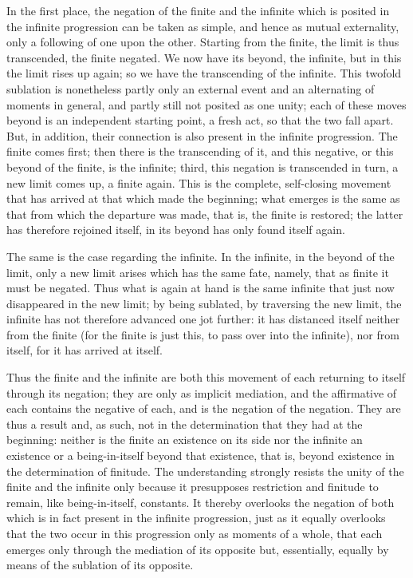 In the first place,
the negation of the finite and the infinite
which is posited in the infinite progression
can be taken as simple,
and hence as mutual externality,
only a following of one upon the other.
Starting from the finite,
the limit is thus transcended, the finite negated.
We now have its beyond, the infinite,
but in this the limit rises up again;
so we have the transcending of the infinite.
This twofold sublation is nonetheless
partly only an external event
and an alternating of moments in general,
and partly still not posited as one unity;
each of these moves beyond is an independent starting point,
a fresh act, so that the two fall apart.
But, in addition, their connection is
also present in the infinite progression.
The finite comes first;
then there is the transcending of it,
and this negative, or this beyond of the finite,
is the infinite;
third, this negation is transcended in turn,
a new limit comes up, a finite again.
This is the complete, self-closing movement
that has arrived at that which made the beginning;
what emerges is the same as that
from which the departure was made,
that is, the finite is restored;
the latter has therefore rejoined itself,
in its beyond has only found itself again.

The same is the case regarding the infinite.
In the infinite, in the beyond of the limit,
only a new limit arises which has the same fate, namely,
that as finite it must be negated.
Thus what is again at hand is the same infinite
that just now disappeared in the new limit;
by being sublated, by traversing the new limit,
the infinite has not therefore advanced one jot further:
it has distanced itself neither from the finite
(for the finite is just this,
to pass over into the infinite),
nor from itself, for it has arrived at itself.

Thus the finite and the infinite are both
this movement of each returning
to itself through its negation;
they are only as implicit mediation,
and the affirmative of each
contains the negative of each,
and is the negation of the negation.
They are thus a result
and, as such, not in the determination
that they had at the beginning:
neither is the finite an existence on its side
nor the infinite an existence
or a being-in-itself beyond that existence,
that is, beyond existence in
the determination of finitude.
The understanding strongly resists
the unity of the finite and the infinite
only because it presupposes restriction
and finitude to remain,
like being-in-itself, constants.
It thereby overlooks the negation of both
which is in fact present in the infinite progression,
just as it equally overlooks that the two occur in this
progression only as moments of a whole,
that each emerges only through the mediation of its opposite
but, essentially, equally by means of the sublation of its opposite.

